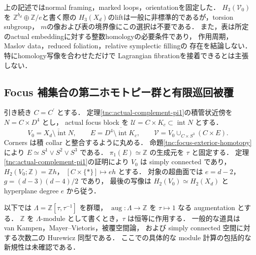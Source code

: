 \begin{remark}[非標準的なsplittingと未決定事項]
\label{tnc:boundary-maps-scope}
上の記述ではnormal framing，marked loops，orientationを固定した．
$H_3(\mathcal V_0)$を
$\mathbb Z^{b_d}\oplus\mathbb Z/e$と書く際の
$H_3(X_d)$のliftは一般に非標準的であるが，torsion subgroup，
$m$の像および表の境界像にこの選択は不要である．
また，表は所定のactual embeddingに対する整数homologyの必要条件であり，
作用周期，Maslov data，reduced foliation，relative symplectic fillingの
存在を結論しない．特にhomology写像を合わせただけで
Lagrangian fibrationを接着できるとは主張しない．
\end{remark}

\subsection{Focus 補集合の第二ホモトピー群と有限巡回被覆}
\label{tnc:equivariant-pi2-section}

引き続き $C=C^\prime$ とする．
定理\ref{tnc:actual-complement-pi1}の積管状近傍を $N=C\times D^4$ とし，
actual focus block を $\mathcal U=C\times K_c\subset\operatorname{int}N$ とする．
\[
 V_0=\overline{X_d\setminus\operatorname{int}N},\qquad
 E=\overline{D^4\setminus\operatorname{int}K_c},\qquad
 \mathcal V=V_0\cup_{C\times S^3}(C\times E).
\]
Corners は積 collar と整合するように丸める．
命題\ref{tnc:focus-exterior-homotopy}により $E\simeq S^1\vee S^2\vee S^3$ である．
$\pi_1(E)\simeq\mathbb Z$ の生成元を $\tau$ と固定する．
定理\ref{tnc:actual-complement-pi1}の証明により $V_0$ は simply connected であり，
$H_2(V_0;\mathbb Z)=\mathbb Z h$，
$[C\times\{*\}]\mapsto e h$ とする．
対象の超曲面では $e=d-2$，$g=(d-3)(d-4)/2$ であり，
最後の写像は $H_2(V_0)\simeq H_2(X_d)$ と hyperplane degree $e$ から従う．

以下では $\Lambda=\mathbb Z[\tau,\tau^{-1}]$ を群環，
$\operatorname{aug}:\Lambda\to\mathbb Z$ を $\tau\mapsto1$ なる augmentation とする．
$\mathbb Z$ を $\Lambda$-module として書くとき，$\tau$ は恒等に作用する．
一般的な道具は van Kampen，Mayer--Vietoris，被覆空間論，
および simply connected 空間に対する次数二の Hurewicz 同型である\cite[Theorem~4.32]{hatcher-bct}．
ここでの具体的な module 計算の包括的な新規性は未確認である．

